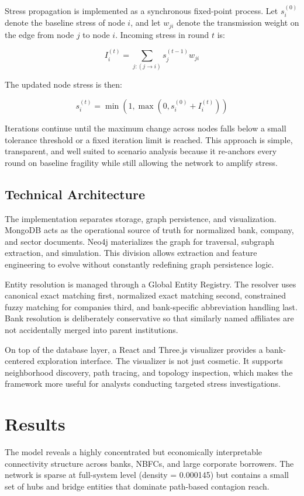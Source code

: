\documentclass[12pt]{article}
\begin{document}
Stress propagation is implemented as a synchronous fixed-point process. Let $s_i^{(0)}$ denote the baseline stress of node $i$, and let $w_{ji}$ denote the transmission weight on the edge from node $j$ to node $i$. Incoming stress in round $t$ is:

\[
I_i^{(t)} = \sum_{j:(j \to i)} s_j^{(t-1)} w_{ji}
\]

The updated node stress is then:

\[
s_i^{(t)} = \min \left(1, \max \left(0, s_i^{(0)} + I_i^{(t)} \right)\right)
\]

Iterations continue until the maximum change across nodes falls below a small tolerance threshold or a fixed iteration limit is reached. This approach is simple, transparent, and well suited to scenario analysis because it re-anchors every round on baseline fragility while still allowing the network to amplify stress.

\subsection*{Technical Architecture}

The implementation separates storage, graph persistence, and visualization. MongoDB acts as the operational source of truth for normalized bank, company, and sector documents. Neo4j materializes the graph for traversal, subgraph extraction, and simulation. This division allows extraction and feature engineering to evolve without constantly redefining graph persistence logic.

Entity resolution is managed through a Global Entity Registry. The resolver uses canonical exact matching first, normalized exact matching second, constrained fuzzy matching for companies third, and bank-specific abbreviation handling last. Bank resolution is deliberately conservative so that similarly named affiliates are not accidentally merged into parent institutions.

On top of the database layer, a React and Three.js visualizer provides a bank-centered exploration interface. The visualizer is not just cosmetic. It supports neighborhood discovery, path tracing, and topology inspection, which makes the framework more useful for analysts conducting targeted stress investigations.

\section*{Results}

The model reveals a highly concentrated but economically interpretable connectivity structure across banks, NBFCs, and large corporate borrowers. The network is sparse at full-system level (density = 0.000145) but contains a small set of hubs and bridge entities that dominate path-based contagion reach.
\end{document}
